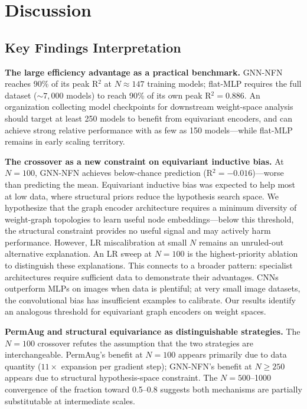 \section{Discussion}
\label{sec:discussion}

\subsection{Key Findings Interpretation}

\textbf{The large efficiency advantage as a practical benchmark.} GNN-NFN reaches 90\% of its peak R$^2$ at $N{\approx}147$ training models; flat-MLP requires the full dataset (${\sim}7{,}000$ models) to reach 90\% of its own peak R$^2{=}0.886$. An organization collecting model checkpoints for downstream weight-space analysis should target at least 250 models to benefit from equivariant encoders, and can achieve strong relative performance with as few as 150 models---while flat-MLP remains in early scaling territory.

\textbf{The crossover as a new constraint on equivariant inductive bias.} At $N{=}100$, GNN-NFN achieves below-chance prediction (R$^2{=}{-}0.016$)---worse than predicting the mean. Equivariant inductive bias was expected to help most at low data, where structural priors reduce the hypothesis search space. We hypothesize that the graph encoder architecture requires a minimum diversity of weight-graph topologies to learn useful node embeddings---below this threshold, the structural constraint provides no useful signal and may actively harm performance. However, LR miscalibration at small $N$ remains an unruled-out alternative explanation. An LR sweep at $N{=}100$ is the highest-priority ablation to distinguish these explanations. This connects to a broader pattern: specialist architectures require sufficient data to demonstrate their advantages. CNNs outperform MLPs on images when data is plentiful; at very small image datasets, the convolutional bias has insufficient examples to calibrate. Our results identify an analogous threshold for equivariant graph encoders on weight spaces.

\textbf{PermAug and structural equivariance as distinguishable strategies.} The $N{=}100$ crossover refutes the assumption that the two strategies are interchangeable. PermAug's benefit at $N{=}100$ appears primarily due to data quantity ($11{\times}$ expansion per gradient step); GNN-NFN's benefit at $N{\geq}250$ appears due to structural hypothesis-space constraint. The $N{=}500$--1000 convergence of the fraction toward 0.5--0.8 suggests both mechanisms are partially substitutable at intermediate scales.

